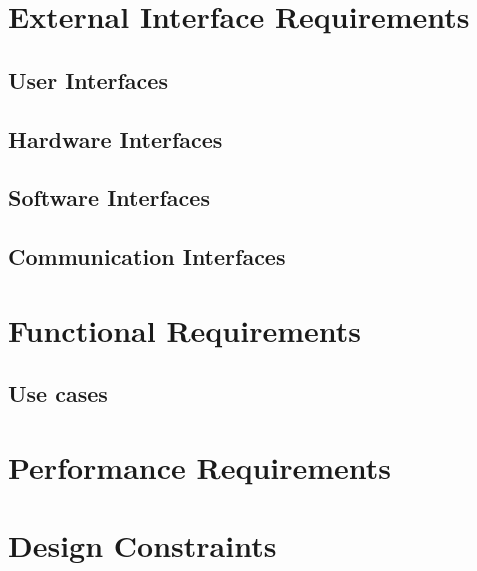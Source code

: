 \section{External Interface Requirements}
\label{sec:External Interface Requirements}%

\subsection{User Interfaces}
\label{sec:user interfaces}%


\subsection{Hardware Interfaces}
\label{sec:hardware interfaces}%


\subsection{Software Interfaces}
\label{sec:software interfaces}%


\subsection{Communication Interfaces}
\label{sec:communication interfaces}%

\section{Functional Requirements}
\label{sec:Functional Requirements}%

\subsection{Use cases}
\label{sec:Use cases}%


\section{Performance Requirements}
\label{sec:Performance Requirements}%

\section{Design Constraints}
\label{sec:Design Constraints}%

